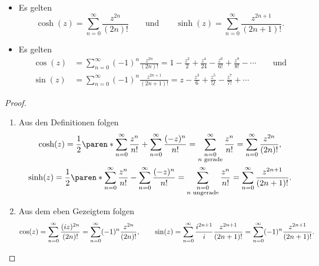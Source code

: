 \documentclass[a4paper]{article}
\begin{document}
\begin{theorem}[Reihendarstellung]\leavevmode
    \begin{itemize}
        \item Es gelten
              \begin{equation*}
                  \cosh(z) = \sum_{n=0}^\infty \frac{z^{2n}}{(2n)!} \qquad\text{und}\qquad \sinh(z) = \sum_{n=0}^\infty \frac{z^{2n+1}}{(2n+1)!}.
              \end{equation*}
        \item Es gelten
              \begin{align*}
                  \cos(z) & = \sum_{n=0}^\infty (-1)^n \frac{z^{2n}}{(2n)!} = 1 - \frac{z^2}{2} + \frac{z^4}{24} - \frac{z^6}{6!} + \frac{z^8}{8!} - \cdots \qquad\text{und} \\
                  \sin(z) & = \sum_{n=0}^\infty (-1)^n \frac{z^{2n+1}}{(2n+1)!} = z - \frac{z^3}{6} + \frac{z^5}{5!} - \frac{z^7}{7!} + \cdots
              \end{align*}
    \end{itemize}
\end{theorem}

\begin{proof}\leavevmode
    \begin{enumerate}
        \item Aus den Definitionen folgen
              \begin{gather*}
                  \cosh(z) = \frac{1}{2} \paren*{\sum_{n=0}^\infty \frac{z^n}{n!} + \sum_{n=0}^\infty \frac{(-z)^n}{n!}} = \sum_{\substack{n=0\\n\text{ gerade}}}^\infty \frac{z^n}{n!} = \sum_{n=0}^\infty \frac{z^{2n}}{(2n)!}, \\
                  \sinh(z) = \frac{1}{2} \paren*{\sum_{n=0}^\infty \frac{z^n}{n!} - \sum_{n=0}^\infty \frac{(-z)^n}{n!}} = \sum_{\substack{n=0\\n\text{ ungerade}}}^\infty \frac{z^n}{n!} = \sum_{n=0}^\infty \frac{z^{2n+1}}{(2n+1)!}.
              \end{gather*}
        \item Aus dem eben Gezeigtem folgen
              \begin{equation*}
                  \cos(z) = \sum_{n=0}^\infty \frac{(iz)^{2n}}{(2n)!} = \sum_{n=0}^\infty (-1)^n \frac{z^{2n}}{(2n)!}, \qquad \sin(z) = \sum_{n=0}^\infty \frac{i^{2n+1}}{i} \frac{z^{2n+1}}{(2n+1)!} = \sum_{n=0}^\infty (-1)^n \frac{z^{2n+1}}{(2n+1)!}. \qedhere
              \end{equation*}
    \end{enumerate}
\end{proof}
\end{document}
